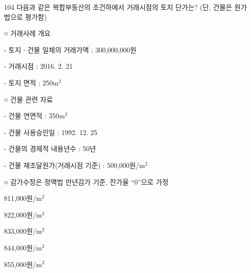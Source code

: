 \begin{question}{104}
다음과 같은 복합부동산의 조건하에서 거래시점의 토지 단가는? (단, 건물은 원가법으로 평가함)
\begin{framedtext}
○ 거래사례 개요 \par
\hspace*{1em}- 토지ㆍ건물 일체의 거래가액 : 300,000,000원 \par
\hspace*{1em}- 거래시점 : 2016. 2. 21 \par
\hspace*{1em}- 토지 면적 : 250m$^2$ \par
○ 건물 관련 자료 \par
\hspace*{1em}- 건물 연면적 : 350m$^2$ \par
\hspace*{1em}- 건물 사용승인일 : 1992. 12. 25 \par
\hspace*{1em}- 건물의 경제적 내용년수 : 50년 \par
\hspace*{1em}- 건물 재조달원가(거래시점 기준) : 500,000원/m$^2$ \par
○ 감가수정은 정액법 만년감가 기준, 잔가율 “0”으로 가정 \par
\end{framedtext}
\begin{choices}
  \item 811,000원/m$^2$
  \item 822,000원/m$^2$
  \item 833,000원/m$^2$
  \item 844,000원/m$^2$
  \item 855,000원/m$^2$
\end{choices}
\end{question}
